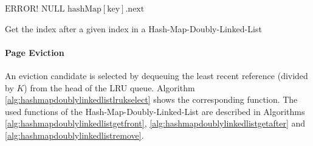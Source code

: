 \begin{@empty}
    \begin{algorithm}[h]
        \scriptsize
        \begin{algorithmic}[1]
                    \State \Return $\text{ERROR!}$
                    \State \Return $\text{NULL}$
                \Else
                    \State \Return $\text{hashMap}\left[\text{key}\right].\text{next}$
                \EndIf
            \EndFunction
        \end{algorithmic}
        \vspace{1em}
        \caption[{\footnotesize \textbf{function} \textsc{getAfter}} of Hash-Map-Doubly-Linked-List]{Get the index after a given index in a Hash-Map-Doubly-Linked-List}
        \label{alg:hashmapdoublylinkedlistgetafter}
    \end{algorithm}
\end{@empty}


\paragraph{Page Eviction}

    An eviction candidate is selected by dequeuing the least recent reference (divided by $K$) from the head of the LRU queue. Algorithm \ref{alg:hashmapdoublylinkedlistlrukselect} shows the corresponding function. The used functions of the Hash-Map-Doubly-Linked-List are described in Algorithms \ref{alg:hashmapdoublylinkedlistgetfront}, \ref{alg:hashmapdoublylinkedlistgetafter} and \ref{alg:hashmapdoublylinkedlistremove}.

